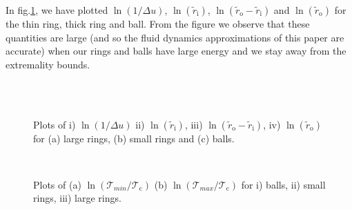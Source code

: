 \documentclass[12pt,a4paper]{article}
\newcommand{\tc}{\mathcal{T_\mathrm{c}}}
\newcommand{\tloc}{\mathcal{T}}
\newcommand{\z}{\tilde{r}}
\newcommand{\zi}{\z_\mathrm{i}}
\newcommand{\zo}{\z_\mathrm{o}}
\begin{document}
In fig.\ref{validity:fig}, we have plotted $\ln(1/\Delta u)$,
$\ln(\zi)$, $\ln(\zo-\zi)$ and $\ln(\zo)$ for the thin ring, thick
ring and ball. From the figure we observe that these quantities are
large (and so the fluid dynamics approximations of this paper are
accurate) when our rings and balls have large energy and we stay
away from the extremality bounds.

\begin{figure}
%
 \begin{center}
   
   
   \\
   
   
   \\
   
   
 \end{center}
 \caption{Plots of i) $\ln(1/\Delta u)$ ii) $\ln(\zi)$, iii) $\ln(\zo-\zi)$,
iv) $\ln(\zo)$ for (a) large rings, (b) small rings and (c) balls.}
\label{validity:fig}
\end{figure}





\begin{figure}
%
 \begin{center}
   
   
   \\
   
   
   
 \end{center}
 \caption{Plots of (a) $\ln(\tloc_{min}/\tc)$ (b)
$\ln(\tloc_{max}/\tc)$ for i) balls, ii) small rings, iii) large
rings.} \label{linvalidity:fig}
\end{figure}
\end{document}

